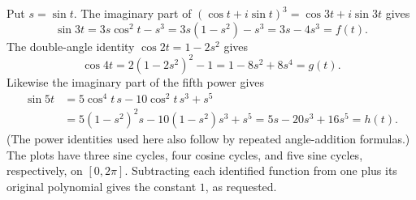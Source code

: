 Put $s=\sin t$. The imaginary part of
$(\cos t+i\sin t)^3=\cos3t+i\sin3t$ gives
\[
 \sin3t=3s\cos^2t-s^3=3s(1-s^2)-s^3=3s-4s^3=f(t).
\]
The double-angle identity $\cos2t=1-2s^2$ gives
\[
 \cos4t=2(1-2s^2)^2-1=1-8s^2+8s^4=g(t).
\]
Likewise the imaginary part of the fifth power gives
\begin{align*}
 \sin5t&=5\cos^4t\,s-10\cos^2t\,s^3+s^5\\
 &=5(1-s^2)^2s-10(1-s^2)s^3+s^5
 =5s-20s^3+16s^5=h(t).
\end{align*}
(The power identities used here also follow by repeated angle-addition formulas.)
The plots have three sine cycles, four cosine cycles, and five sine cycles,
respectively, on $[0,2\pi]$. Subtracting each identified function from one
plus its original polynomial gives the constant $1$, as requested.
